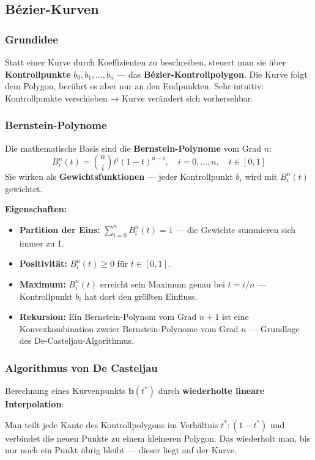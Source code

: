 \documentclass[12pt, a4paper]{article}
\begin{document}
\subsection{Bézier-Kurven}

\subsubsection*{Grundidee}

Statt einer Kurve durch Koeffizienten zu beschreiben, steuert man sie über \textbf{Kontrollpunkte} $b_0, b_1, \dots, b_n$ — das \textbf{Bézier-Kontrollpolygon}. Die Kurve folgt dem Polygon, berührt es aber nur an den Endpunkten. Sehr intuitiv: Kontrollpunkte verschieben → Kurve verändert sich vorhersehbar.

\subsubsection*{Bernstein-Polynome}

Die mathematische Basis sind die \textbf{Bernstein-Polynome} vom Grad $n$:
\[
  B_i^n(t) = \binom{n}{i} t^i (1-t)^{n-i}, \quad i = 0, \dots, n,\quad t \in [0,1]
\]
Sie wirken als \textbf{Gewichtsfunktionen} — jeder Kontrollpunkt $b_i$ wird mit $B_i^n(t)$ gewichtet.

\textbf{Eigenschaften:}
\begin{itemize}
  \item \textbf{Partition der Eins:} $\sum_{i=0}^{n} B_i^n(t) = 1$ — die Gewichte summieren sich immer zu 1.
  \item \textbf{Positivität:} $B_i^n(t) \geq 0$ für $t \in [0,1]$.
  \item \textbf{Maximum:} $B_i^n(t)$ erreicht sein Maximum genau bei $t = i/n$ — Kontrollpunkt $b_i$ hat dort den größten Einfluss.
  \item \textbf{Rekursion:} Ein Bernstein-Polynom vom Grad $n{+}1$ ist eine Konvexkombination zweier Bernstein-Polynome vom Grad $n$ — Grundlage des De-Casteljau-Algorithmus.
\end{itemize}

\subsubsection*{Algorithmus von De Casteljau}

Berechnung eines Kurvenpunkts $\mathbf{b}(t^*)$ durch \textbf{wiederholte lineare Interpolation}:

Man teilt jede Kante des Kontrollpolygons im Verhältnis $t^* : (1-t^*)$ und verbindet die neuen Punkte zu einem kleineren Polygon. Das wiederholt man, bis nur noch ein Punkt übrig bleibt — dieser liegt auf der Kurve.
\end{document}
